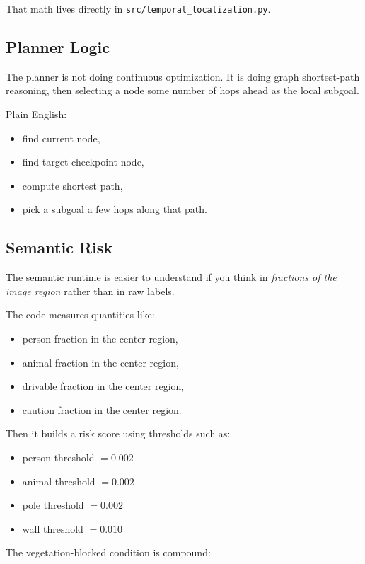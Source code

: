 \documentclass[11pt]{article}
\begin{document}
That math lives directly in \texttt{src/temporal\_localization.py}.

\subsection{Planner Logic}

The planner is not doing continuous optimization. It is doing graph shortest-path
reasoning, then selecting a node some number of hops ahead as the local subgoal.

Plain English:

\begin{itemize}[nosep]
  \item find current node,
  \item find target checkpoint node,
  \item compute shortest path,
  \item pick a subgoal a few hops along that path.
\end{itemize}

\subsection{Semantic Risk}

The semantic runtime is easier to understand if you think in \emph{fractions of the
image region} rather than in raw labels.

The code measures quantities like:

\begin{itemize}[nosep]
  \item person fraction in the center region,
  \item animal fraction in the center region,
  \item drivable fraction in the center region,
  \item caution fraction in the center region.
\end{itemize}

Then it builds a risk score using thresholds such as:

\begin{itemize}[nosep]
  \item person threshold \(= 0.002\)
  \item animal threshold \(= 0.002\)
  \item pole threshold \(= 0.002\)
  \item wall threshold \(= 0.010\)
\end{itemize}

The vegetation-blocked condition is compound:
\end{document}
